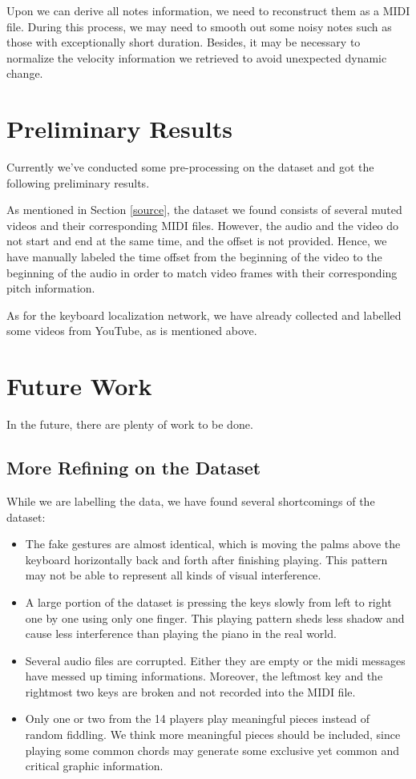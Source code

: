 \documentclass[10pt,twocolumn,letterpaper]{article}
\begin{document}
Upon we can derive all notes information, we need to reconstruct them as a MIDI file. During this process, we may need to smooth out some noisy notes such as those with exceptionally short duration. Besides, it may be necessary to normalize the velocity information we retrieved to avoid unexpected dynamic change.

\section{Preliminary Results}
\label{result}
Currently we've conducted some pre-processing on the dataset and got the following preliminary results.

As mentioned in Section \ref{source}, the dataset we found consists of several muted videos and their corresponding MIDI files. 
However, the audio and the video do not start and end at the same time, and the offset is not provided.
Hence, we have manually labeled the time offset from the beginning of the video to the beginning of the audio in order to match video frames with their corresponding pitch information.

As for the keyboard localization network, we have already collected and labelled some videos from YouTube, as is mentioned above.

\section{Future Work}
In the future, there are plenty of work to be done.

\subsection{More Refining on the Dataset}
  
While we are labelling the data, we have found several shortcomings of the dataset:
\begin{itemize}
  \item The fake gestures are almost identical, which is moving the palms above the keyboard horizontally back and forth after finishing playing. This pattern may not be able to represent all kinds of visual interference.
  \item A large portion of the dataset is pressing the keys slowly from left to right one by one using only one finger. This playing pattern sheds less shadow and cause less interference than playing the piano in the real world.
  \item Several audio files are corrupted. Either they are empty or the midi messages have messed up timing informations. Moreover, the leftmost key and the rightmost two keys are broken and not recorded into the MIDI file.
  \item Only one or two from the 14 players play meaningful pieces instead of random fiddling. We think more meaningful pieces should be included, since playing some common chords may generate some exclusive yet common and critical graphic information.
\end{itemize}
\end{document}
